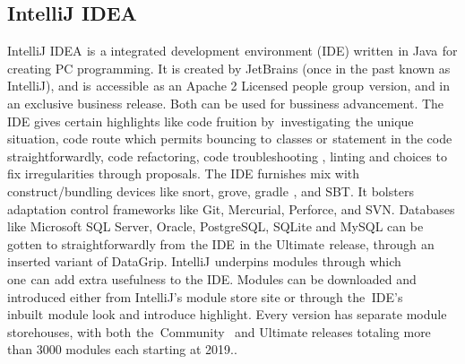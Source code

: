 \documentclass[oneside,12pt]{Classes/VTU}
\begin{document}
	\subsection{IntelliJ IDEA}
	IntelliJ IDEA\tiny\textcolor{white}{s}\normalsize is\tiny\textcolor{white}{s}\normalsize a integrated\tiny\textcolor{white}{s}\normalsize development\tiny\textcolor{white}{s}\normalsize environment (IDE) written\tiny\textcolor{white}{s}\normalsize in Java\tiny\textcolor{white}{s}\normalsize for creating PC programming. It is created by JetBrains (once in the past known as IntelliJ), and is\tiny\textcolor{white}{s}\normalsize accessible\tiny\textcolor{white}{s}\normalsize as an Apache 2 Licensed people\tiny\textcolor{white}{s}\normalsize group\tiny\textcolor{white}{s}\normalsize version, and in an exclusive business release. Both can be used for bussiness advancement. The IDE gives certain highlights like code fruition by\tiny\textcolor{white}{y}\normalsize investigating\tiny\textcolor{white}{s}\normalsize the unique situation, code route which permits bouncing to\tiny\textcolor{white}{s}\normalsize classes or\tiny\textcolor{white}{s}\normalsize statement in the code straightforwardly, code refactoring, code troubleshooting , linting and choices to fix irregularities through proposals. The IDE furnishes mix with construct/bundling devices like snort, grove, gradle\tiny\textcolor{white}{s}\normalsize , and SBT. It bolsters adaptation control frameworks like Git, Mercurial, Perforce, and SVN. Databases like Microsoft SQL Server, Oracle, PostgreSQL, SQLite and MySQL can be gotten to straightforwardly from\tiny\textcolor{white}{s}\normalsize the IDE\tiny\textcolor{white}{s}\normalsize in the Ultimate\tiny\textcolor{white}{s}\normalsize release, through\tiny\textcolor{white}{t}\normalsize an inserted variant of DataGrip. IntelliJ\tiny\textcolor{white}{s}\normalsize underpins modules through\tiny\textcolor{white}{t}\normalsize which one\tiny\textcolor{white}{s}\normalsize can\tiny\textcolor{white}{s}\normalsize add extra usefulness to the IDE. Modules can be downloaded and introduced either from IntelliJ's module store site or through\tiny\textcolor{white}{t}\normalsize the\tiny\textcolor{white}{y}\normalsize IDE's inbuilt\tiny\textcolor{white}{s}\normalsize module look and introduce highlight. Every version has separate module storehouses, with both\tiny\textcolor{white}{s}\normalsize the\tiny\textcolor{white}{y}\normalsize Community\tiny\textcolor{white}{es}\normalsize and Ultimate\tiny\textcolor{white}{f}\normalsize releases totaling more than 3000 modules each starting at 2019..
	
\end{document}
